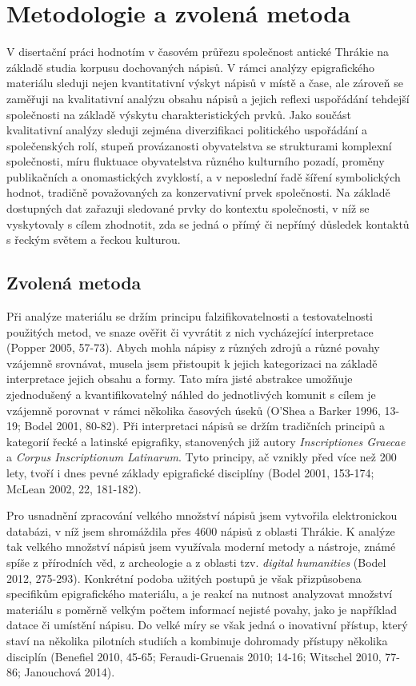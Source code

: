\chapter{Metodologie a zvolená metoda}
V disertační práci hodnotím v časovém průřezu společnost antické Thrákie na základě studia korpusu dochovaných nápisů. V rámci analýzy epigrafického materiálu sleduji nejen kvantitativní výskyt nápisů v místě a čase, ale zároveň se zaměřuji na kvalitativní analýzu obsahu nápisů a jejich reflexi uspořádání tehdejší společnosti na základě výskytu charakteristických prvků. Jako součást kvalitativní analýzy sleduji zejména diverzifikaci politického uspořádání a společenských rolí, stupeň provázanosti obyvatelstva se strukturami komplexní společnosti, míru fluktuace obyvatelstva různého kulturního pozadí, proměny publikačních a onomastických zvyklostí, a v neposlední řadě šíření symbolických hodnot, tradičně považovaných za konzervativní prvek společnosti. Na základě dostupných dat zařazuji sledované prvky do kontextu společnosti, v níž se vyskytovaly s cílem zhodnotit, zda se jedná o přímý či nepřímý důsledek kontaktů s řeckým světem a řeckou kulturou.

\section[zvolená-metoda]{Zvolená metoda}

Při analýze materiálu se držím principu falzifikovatelnosti a testovatelnosti použitých metod, ve snaze ověřit či vyvrátit z nich vycházející interpretace (Popper 2005, 57-73). Abych mohla nápisy z různých zdrojů a různé povahy vzájemně srovnávat, musela jsem přistoupit k jejich kategorizaci na základě interpretace jejich obsahu a formy. Tato míra jisté abstrakce umožňuje zjednodušený a kvantifikovatelný náhled do jednotlivých komunit s cílem je vzájemně porovnat v rámci několika časových úseků (O'Shea a Barker 1996, 13-19; Bodel 2001, 80-82). Při interpretaci nápisů se držím tradičních principů a kategorií řecké a latinské epigrafiky, stanovených již autory {\em Inscriptiones Graecae} a {\em Corpus Inscriptionum Latinarum}. Tyto principy, ač vznikly před více než 200 lety, tvoří i dnes pevné základy epigrafické disciplíny (Bodel 2001, 153-174; McLean 2002, 22, 181-182).

Pro usnadnění zpracování velkého množství nápisů jsem vytvořila elektronickou databázi, v níž jsem shromáždila přes 4600 nápisů z oblasti Thrákie. K analýze tak velkého množství nápisů jsem využívala moderní metody a nástroje, známé spíše z přírodních věd, z archeologie a z oblasti tzv. {\em digital humanities} (Bodel 2012, 275-293). Konkrétní podoba užitých postupů je však přizpůsobena specifikům epigrafického materiálu, a je reakcí na nutnost analyzovat množství materiálu s poměrně velkým počtem informací nejisté povahy, jako je například datace či umístění nápisu. Do velké míry se však jedná o inovativní přístup, který staví na několika pilotních studiích a kombinuje dohromady přístupy několika disciplín (Benefiel 2010, 45-65; Feraudi-Gruenais 2010; 14-16; Witschel 2010, 77-86; Janouchová 2014).

